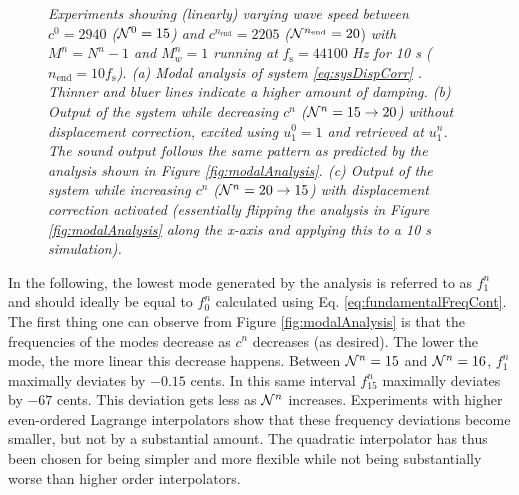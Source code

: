 \begin{figure}[t!]
    \vspace{-1em}\caption{{\it Experiments showing (linearly) varying wave speed between $c^0 = 2940$ ($\mathcal{N}^0 = 15$) and} $c^{n_\text{end}} = 2205$ {\it (}$\mathcal{N}^{n_\text{end}} = 20$) {\it with $M^n = N^n - 1$ and $M_w^n = 1$ running at }$f_\text{s} = 44100$ {\it Hz for 10 s (}$n_\text{end} = 10f_\text{s}${\it ). (a) Modal analysis of system \eqref{eq:sysDispCorr}%
    . Thinner and bluer lines indicate a higher amount of damping. (b) Output of the system while decreasing $c^n$ ($\mathcal{N}^n = 15 \rightarrow 20$) without displacement correction, excited using $u_1^0=1$ and retrieved at $u_1^n$. The sound output follows the same pattern as predicted by the analysis shown in Figure \ref{fig:modalAnalysis}. (c) Output of the system while increasing $c^n$ ($\mathcal{N}^n = 20 \rightarrow 15$) with displacement correction activated (essentially flipping the analysis in Figure \ref{fig:modalAnalysis} along the x-axis and applying this to a 10 s simulation).}\label{fig:analysisAndSpecs}}
\end{figure}
In the following, %
the lowest mode generated by the analysis is referred to as $f_1^n$ and should ideally be equal to $f_0^n$ calculated using Eq. \eqref{eq:fundamentalFreqCont}. %
%
The first thing one can observe from Figure \ref{fig:modalAnalysis} is that the frequencies of the modes decrease as $c^n$ decreases (as desired). The lower the mode, the more linear this decrease happens. Between $\mathcal{N}^n = 15$ and $\mathcal{N}^n = 16$, $f_1^n$ maximally deviates by $-0.15$ cents. In this same interval $f_{15}^n$ maximally deviates by $-67$ cents. This deviation %
gets %
less as $\mathcal{N}^n$ increases. %
%
Experiments with higher even-ordered Lagrange interpolators show that these frequency deviations become smaller, but not by a substantial amount. The quadratic interpolator has thus been chosen for being simpler and more flexible while not being substantially worse than higher order interpolators.

